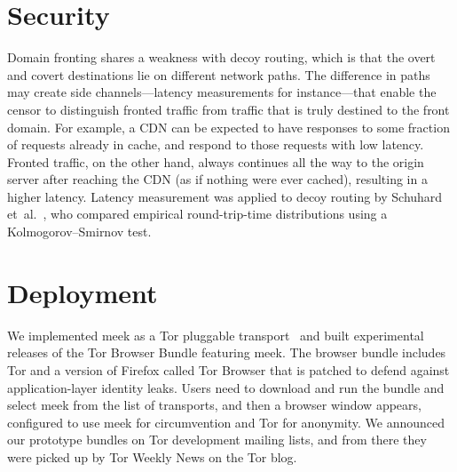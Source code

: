\documentclass{article}
\begin{document}
\section{Security}

Domain fronting shares a weakness with decoy routing,
which is that the overt and covert destinations lie on different
network paths.
The difference in paths may create side channels---latency measurements for instance---that
enable the censor to
distinguish fronted traffic from traffic that is truly destined
to the front domain.
For example, a CDN can be expected to have responses
to some fraction of requests already in cache,
and respond to those requests with low latency.
Fronted traffic, on the other hand, always continues all the way
to the origin server after reaching the CDN (as if nothing were ever cached),
resulting in a higher latency.
Latency measurement was applied to decoy routing by Schuhard et~al.~\cite[Section~5]{ccs2012-decoys},
who compared empirical round-trip-time distributions using a
Kolmogorov--Smirnov test.



\section{Deployment}
\label{sec:deployment}

We implemented meek as a Tor pluggable transport~\cite{pt}
and built experimental releases of the Tor Browser Bundle featuring meek.
The browser bundle includes Tor and a version of Firefox
called Tor Browser that is patched to defend against application-layer identity leaks.
Users need to download and run the bundle and select meek from the list of transports,
and then a browser window appears,
configured to use meek for circumvention and Tor for anonymity.
We announced our prototype bundles on Tor development mailing lists,
and from there they were picked up by Tor Weekly News on the Tor blog.
\end{document}
